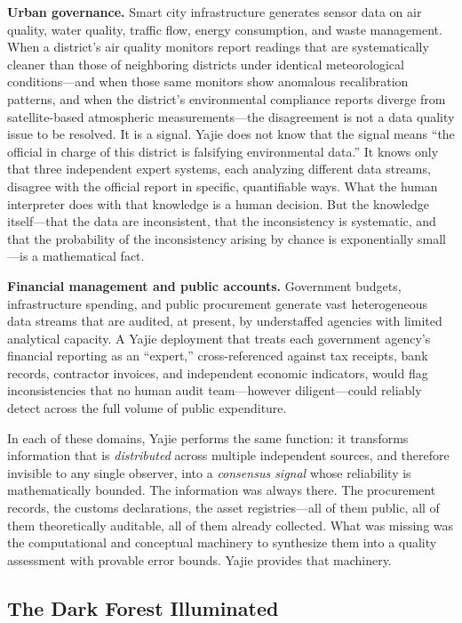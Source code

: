 \documentclass[12pt,a4paper]{article}
\theoremstyle{definition}
\theoremstyle{remark}
\begin{document}
\textbf{Urban governance.} Smart city infrastructure generates sensor data on air quality, water quality, traffic flow, energy consumption, and waste management. When a district's air quality monitors report readings that are systematically cleaner than those of neighboring districts under identical meteorological conditions—and when those same monitors show anomalous recalibration patterns, and when the district's environmental compliance reports diverge from satellite-based atmospheric measurements—the disagreement is not a data quality issue to be resolved. It is a signal. Yajie does not know that the signal means ``the official in charge of this district is falsifying environmental data.'' It knows only that three independent expert systems, each analyzing different data streams, disagree with the official report in specific, quantifiable ways. What the human interpreter does with that knowledge is a human decision. But the knowledge itself—that the data are inconsistent, that the inconsistency is systematic, and that the probability of the inconsistency arising by chance is exponentially small—is a mathematical fact.

\textbf{Financial management and public accounts.} Government budgets, infrastructure spending, and public procurement generate vast heterogeneous data streams that are audited, at present, by understaffed agencies with limited analytical capacity. A Yajie deployment that treats each government agency's financial reporting as an ``expert,'' cross-referenced against tax receipts, bank records, contractor invoices, and independent economic indicators, would flag inconsistencies that no human audit team—however diligent—could reliably detect across the full volume of public expenditure.

In each of these domains, Yajie performs the same function: it transforms information that is \textit{distributed} across multiple independent sources, and therefore invisible to any single observer, into a \textit{consensus signal} whose reliability is mathematically bounded. The information was always there. The procurement records, the customs declarations, the asset registries—all of them public, all of them theoretically auditable, all of them already collected. What was missing was the computational and conceptual machinery to synthesize them into a quality assessment with provable error bounds. Yajie provides that machinery.

\subsection{The Dark Forest Illuminated}
\end{document}
